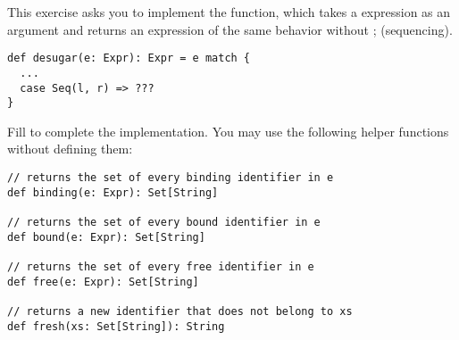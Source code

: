 \begin{exercise}

This exercise asks you to implement the  function, which
takes a \lang expression as an argument and returns an expression of the same
behavior without \textsf{;} (sequencing).

\begin{verbatim}
def desugar(e: Expr): Expr = e match {
  ...
  case Seq(l, r) => ???
}
\end{verbatim}

Fill  to complete the implementation.
You may use the following helper functions without defining them:
\begin{verbatim}
// returns the set of every binding identifier in e
def binding(e: Expr): Set[String]

// returns the set of every bound identifier in e
def bound(e: Expr): Set[String]

// returns the set of every free identifier in e
def free(e: Expr): Set[String]

// returns a new identifier that does not belong to xs
def fresh(xs: Set[String]): String
\end{verbatim}

\end{exercise}

